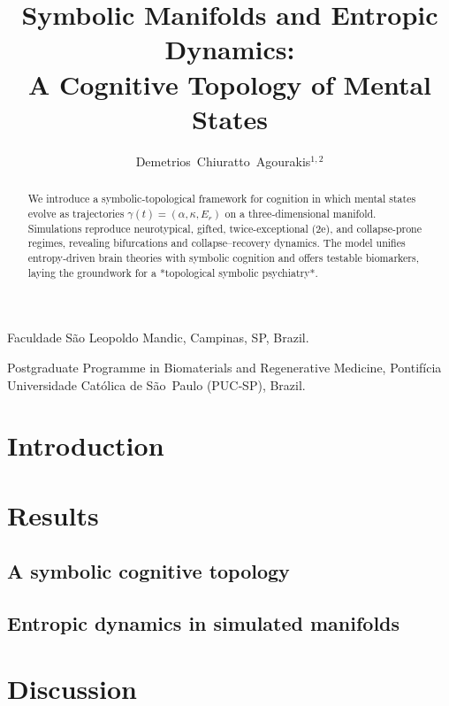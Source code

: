 \documentclass{nature}             %
\title{Symbolic Manifolds and Entropic Dynamics: \\ A Cognitive Topology of Mental States}
\author{Demetrios Chiuratto Agourakis$^{1,2}$}
\begin{document}
\maketitle

\begin{affiliations}
 \item Faculdade São Leopoldo Mandic, Campinas, SP, Brazil.
 \item Postgraduate Programme in Biomaterials and Regenerative Medicine, Pontifícia Universidade Católica de São Paulo (PUC‑SP), Brazil.
\end{affiliations}

\begin{abstract}
We introduce a symbolic-topological framework for cognition in which mental states evolve as trajectories $\gamma(t) = (\alpha, \kappa, E_r)$ on a three-dimensional manifold. Simulations reproduce neurotypical, gifted, twice-exceptional (2e), and collapse-prone regimes, revealing bifurcations and collapse–recovery dynamics. The model unifies entropy-driven brain theories with symbolic cognition and offers testable biomarkers, laying the groundwork for a *topological symbolic psychiatry*. 
\end{abstract}
\section*{Introduction}


\section*{Results}
\subsection*{A symbolic cognitive topology}


\subsection*{Entropic dynamics in simulated manifolds}


\section*{Discussion}

\end{document}
